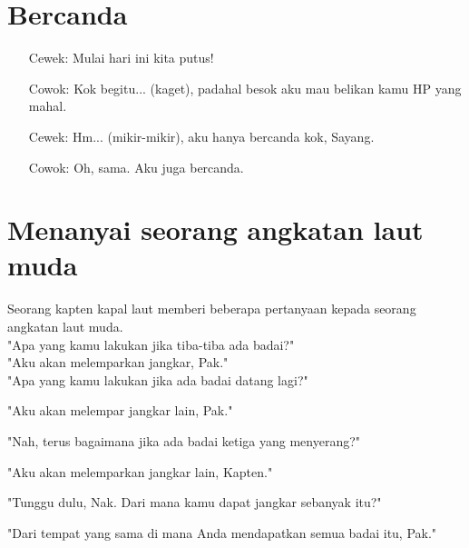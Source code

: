 
\setlength{\parindent}{0cm}
\section*{Bercanda}
\begin{itemize}
\item[Cewek:] Mulai hari ini kita putus!
\item[Cowok:] Kok begitu... (kaget), padahal besok aku mau belikan kamu HP yang mahal.
\item[Cewek:] Hm... (mikir-mikir), aku hanya bercanda kok, Sayang.
\item[Cowok:] Oh, sama. Aku juga bercanda.
\end{itemize}


\section*{Menanyai seorang angkatan laut muda}

Seorang kapten kapal laut memberi beberapa pertanyaan kepada seorang 
angkatan laut muda. \\
"Apa yang kamu lakukan jika tiba-tiba ada badai?"\\
"Aku akan melemparkan jangkar, Pak."\\
"Apa yang kamu lakukan jika ada badai datang lagi?"

"Aku akan melempar jangkar lain, Pak."

"Nah, terus bagaimana jika ada badai ketiga yang menyerang?"

"Aku akan melemparkan jangkar lain, Kapten."

"Tunggu dulu, Nak. Dari mana kamu dapat jangkar sebanyak itu?"

"Dari tempat yang sama di mana Anda mendapatkan semua badai itu, Pak."

\setlength{\parindent}{1cm}
\normalsize